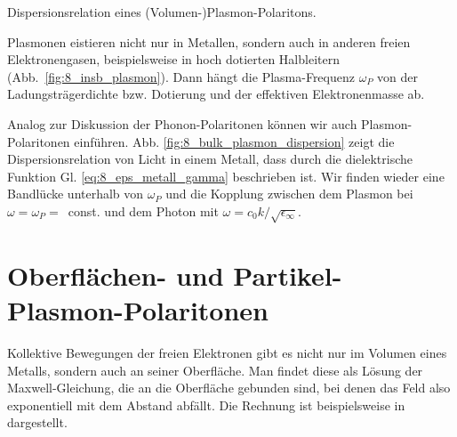 \begin{marginfigure}
    \caption{Dispersionsrelation eines (Volumen-)Plasmon-Polaritons.
    \label{fig:8_bulk_plasmon_dispersion}}
\end{marginfigure}



Plasmonen eistieren nicht nur in Metallen, sondern auch in anderen freien Elektronengasen, beispielsweise in hoch dotierten Halbleitern (Abb.~\ref{fig:8_insb_plasmon}). Dann hängt die Plasma-Frequenz $\omega_P$ von der Ladungsträgerdichte bzw. Dotierung und der effektiven Elektronenmasse ab.




Analog zur Diskussion der Phonon-Polaritonen können wir auch Plasmon-Polaritonen einführen. Abb. \ref{fig:8_bulk_plasmon_dispersion} zeigt die Dispersionsrelation von Licht in einem Metall, dass durch die dielektrische Funktion Gl. \ref{eq:8_eps_metall_gamma} beschrieben ist. Wir finden wieder eine Bandlücke unterhalb von $\omega_P$ und die Kopplung zwischen dem Plasmon bei $\omega = \omega_P = $~const. und dem Photon mit $\omega = c_0 k / \sqrt{\epsilon_\infty}$.



\section*{Oberflächen- und Partikel-Plasmon-Polaritonen}

Kollektive Bewegungen der freien Elektronen gibt es nicht nur im Volumen eines Metalls, sondern auch an seiner Oberfläche. Man findet diese als Lösung der Maxwell-Gleichung, die an die Oberfläche gebunden sind, bei denen das Feld also exponentiell mit dem Abstand abfällt. Die Rechnung ist beispielsweise in \cite{Maier_plasmonics} dargestellt.

